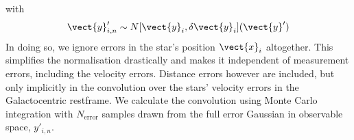 with
\begin{eqnarray}
\vect{y}'_{i,n} \sim N[\vect{y}_i,\delta \vect{y}_i](\vect{y}')\nonumber
\end{eqnarray}
In doing so, we ignore errors in the star's position $\vect{x}_i$ altogether. This simplifies the normalisation drastically and makes it independent of measurement errors, including the velocity errors. Distance errors however are included, but only implicitly in the convolution over the stars' velocity errors in the Galactocentric restframe. We calculate the convolution using Monte Carlo integration with $N_\text{error}$ samples drawn from the full error Gaussian in observable space, $y'_{i,n}$. 
